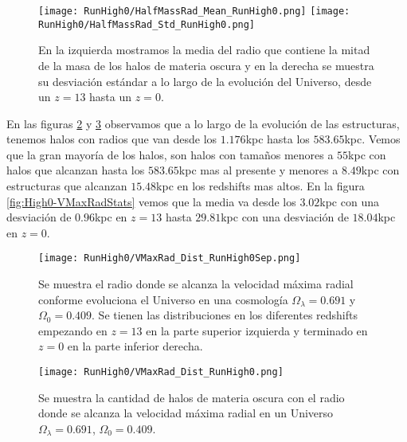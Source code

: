 \begin{figure}[H]
    \centering
    \texttt{[image: RunHigh0/HalfMassRad\_Mean\_RunHigh0.png]}
    \texttt{[image: RunHigh0/HalfMassRad\_Std\_RunHigh0.png]}
    \caption[Media y desviación estándar del radio de la mitad de la masa]{\footnotesize En la izquierda mostramos la media del radio que contiene la mitad de la masa de los halos de materia oscura y en la derecha se muestra su desviación estándar a lo largo de la evolución del Universo, desde un $z=13$ hasta un $z=0$.}
    \label{fig:High0-HalfMassRadStats}
\end{figure}

En las figuras \ref{fig:High0-VMaxRadDistSep} y \ref{fig:High0-VMaxRadDist} observamos que a lo largo de la evolución de las estructuras, tenemos halos con radios que van desde los $1.176$kpc hasta los $583.65$kpc. Vemos que la gran mayoría de los halos, son halos con tamaños menores a $55$kpc con halos que alcanzan hasta los $583.65$kpc mas al presente y menores a $8.49$kpc con estructuras que alcanzan $15.48$kpc en los redshifts mas altos. En la figura \ref{fig:High0-VMaxRadStats} vemos que la media va desde los $3.02$kpc con una desviación de $0.96$kpc en $z=13$ hasta $29.81$kpc con una desviación de $18.04$kpc en $z=0$.

\begin{figure}[H]
    \centering
    \texttt{[image: RunHigh0/VMaxRad\_Dist\_RunHigh0Sep.png]}
    \caption[Radio donde se alcanza la velocidad máxima radial]{\footnotesize Se muestra el radio donde se alcanza la velocidad máxima radial conforme evoluciona el Universo en una cosmología $\Omega_\lambda = 0.691$ y $\Omega_0 = 0.409$. Se tienen las distribuciones en los diferentes redshifts empezando en $z=13$ en la parte superior izquierda y terminado en $z=0$ en la parte inferior derecha.}
    \label{fig:High0-VMaxRadDistSep}
\end{figure}

\begin{figure}[H]
    \centering
    \texttt{[image: RunHigh0/VMaxRad\_Dist\_RunHigh0.png]}
    \caption[Distribución del radio donde se alcanza la velocidad máxima radial]{\footnotesize Se muestra la cantidad de halos de materia oscura con el radio donde se alcanza la velocidad máxima radial en un Universo $\Omega_\lambda = 0.691$, $\Omega_0 = 0.409$.}
    \label{fig:High0-VMaxRadDist}
\end{figure}

